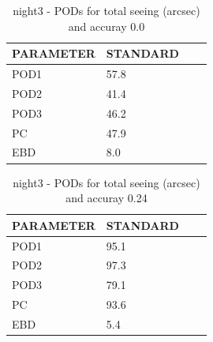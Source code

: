 \begin{table}[p!]
\begin{center}
\begin{tabular}{|l|l|l|l|}
\hline
\multicolumn{1}{|c|}{\cellcolor[HTML]{C0C0C0}\textbf{PARAMETER}} & \multicolumn{1}{c|}{\cellcolor[HTML]{C0C0C0}\textbf{STANDARD}}\\
\hline
\cellcolor[HTML]{C0C0C0}POD1  & 57.8                                \\
\cellcolor[HTML]{C0C0C0}POD2  & 41.4                                \\
\cellcolor[HTML]{C0C0C0}POD3  & 46.2                                \\
\cellcolor[HTML]{C0C0C0}PC    & 47.9                                  \\
\cellcolor[HTML]{C0C0C0}EBD   & 8.0                                 \\
\hline
\end{tabular}
\caption{night3 - PODs for total seeing (arcsec) and accuray 0.0}
\label{tab:podsee0.0:night3}
\end{center}
\end{table}
\begin{table}[p!]
\begin{center}
\begin{tabular}{|l|l|l|l|}
\hline
\multicolumn{1}{|c|}{\cellcolor[HTML]{C0C0C0}\textbf{PARAMETER}} & \multicolumn{1}{c|}{\cellcolor[HTML]{C0C0C0}\textbf{STANDARD}}\\
\hline
\cellcolor[HTML]{C0C0C0}POD1  & 95.1                                \\
\cellcolor[HTML]{C0C0C0}POD2  & 97.3                                \\
\cellcolor[HTML]{C0C0C0}POD3  & 79.1                                \\
\cellcolor[HTML]{C0C0C0}PC    & 93.6                                  \\
\cellcolor[HTML]{C0C0C0}EBD   & 5.4                                 \\
\hline
\end{tabular}
\caption{night3 - PODs for total seeing (arcsec) and accuray 0.24}
\label{tab:podsee0.24:night3}
\end{center}
\end{table}
